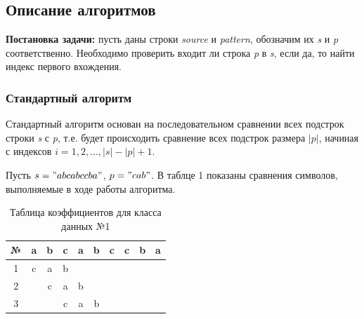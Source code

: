 \documentclass[a4paper,12pt]{article}
\begin{document}
    \begin{center}
	    \subsection{Описание алгоритмов}
    \end{center}
    
\textbf{Постановка задачи:} пусть даны строки \textit{source} и \textit{pattern}, обозначим их \textit{s} и \textit{p} соответственно.  
Необходимо проверить входит ли строка \textit{p} в \textit{s}, если да, то найти индекс первого вхождения.

\subsubsection{Стандартный алгоритм}
Стандартный алгоритм основан на последовательном сравнении всех подстрок строки \textit{s} с \textit{p}, т.е. будет происходить сравнение всех подстрок размера $|p|$, начиная с индексов $i = 1,2,...,|s|-|p|+1$.

Пусть $s= "abcabccba"$, $p = "cab"$. В таблце 1 показаны сравнения символов, выполняемые в ходе работы алгоритма.
\begin{table}[h]
	    		\caption{Таблица коэффициентов для класса данных №1}
	    		\begin{center}
	    			\begin{tabular}{|c|c|c|c|c|c|c|c|c|c|}
	    			\hline
	    			№&a&b&c&a&b&c&c&b&a\\
	    			\hline	    			
	    			1&c&a&b& & & & & &\\
	    			\hline	    			
	    			2& &c&a&b& & & & &\\
	    			\hline	    			
	    			3& & &c&a&b& & & &\\
	    			\hline	    			
	    			\end{tabular}
	    			\label{T:t1}	
	    		\end{center}
\end{table}
\end{document}
